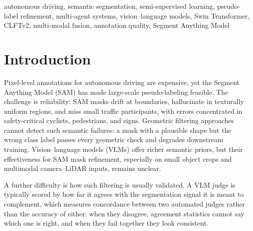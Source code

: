 \documentclass[conference]{IEEEtran}
\begin{document}
\begin{IEEEkeywords}
autonomous driving, semantic segmentation, semi-supervised learning, pseudo-label refinement, multi-agent systems, vision–language models, Swin Transformer, CLFTv2, multi-modal fusion, annotation quality, Segment Anything Model
\end{IEEEkeywords}

\section{Introduction}

Pixel-level annotations for autonomous driving are expensive, yet the Segment Anything Model (SAM) \cite{kirillov2023sam} has made large-scale pseudo-labeling feasible.
The challenge is reliability: SAM masks drift at boundaries, hallucinate in texturally uniform regions, and miss small traffic participants, with errors concentrated in safety-critical cyclists, pedestrians, and signs.
Geometric filtering approaches \cite{zou2019confidence,lee2013pseudo,jaritz2020xmuda} cannot detect such semantic failures: a mask with a plausible shape but the wrong class label passes every geometric check and degrades downstream training.
Vision–language models (VLMs) \cite{liu2024llava,wang2024qwen2vl} offer richer semantic priors, but their effectiveness for SAM mask refinement, especially on small object crops and multimodal camera–LiDAR inputs, remains unclear.

A further difficulty is how such filtering is usually validated. A VLM judge is typically scored by how far it agrees with the segmentation signal it is meant to complement, which measures concordance between two automated judges rather than the accuracy of either: when they disagree, agreement statistics cannot say which one is right, and when they fail together they look consistent.
\end{document}
